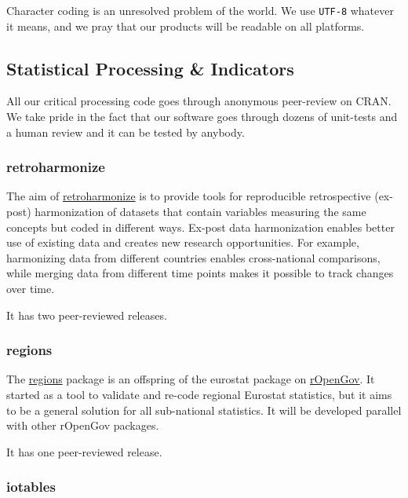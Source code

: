 \documentclass[
  fontsize=13pt,
  english,
  a4paper,
  openany, a4paper, oneside]{article}
\begin{document}
Character coding is an unresolved problem of the world. We use \texttt{UTF-8} whatever it means, and we pray that our products will be readable on all platforms.

\hypertarget{statistical-software}{%
\subsection{Statistical Processing \& Indicators}\label{statistical-software}}

All our critical processing code goes through anonymous peer-review on CRAN. We take pride in the fact that our software goes through dozens of unit-tests and a human review and it can be tested by anybody.

\hypertarget{retroharmonize}{%
\subsubsection{retroharmonize}\label{retroharmonize}}

The aim of \href{https://reprex.nl/software/retroharmonize/}{retroharmonize} is to provide tools for reproducible retrospective (ex-post) harmonization of datasets that contain variables measuring the same concepts but coded in different ways. Ex-post data harmonization enables better use of existing data and creates new research opportunities. For example, harmonizing data from different countries enables cross-national comparisons, while merging data from different time points makes it possible to track changes over time. \citep{R-retroharmonize}

It has two peer-reviewed releases.

\hypertarget{regions}{%
\subsubsection{regions}\label{regions}}

The \href{https://reprex.nl/software/regions/}{regions} package is an offspring of the eurostat package on \href{https://github.com/rOpenGov}{rOpenGov}. It started as a tool to validate and re-code regional Eurostat statistics, but it aims to be a general solution for all sub-national statistics. It will be developed parallel with other rOpenGov packages. \citep{R-regions}

It has one peer-reviewed release.

\hypertarget{iotables}{%
\subsubsection{iotables}\label{iotables}}
\end{document}
